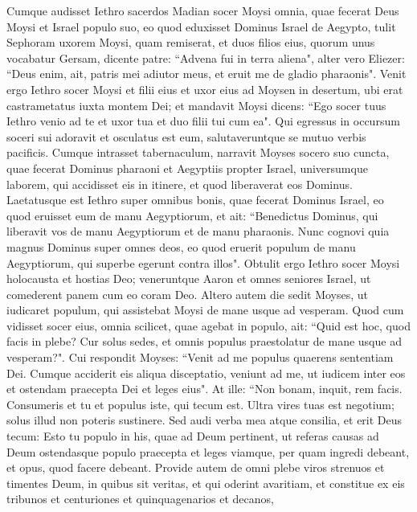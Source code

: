 \begin{biblechapter}  
\verse Cumque audisset Iethro sacerdos Madian socer Moysi omnia, quae fecerat Deus Moysi et Israel populo suo, eo quod eduxisset Dominus Israel de Aegypto,  
\verse tulit Sephoram uxorem Moysi, quam remiserat, 
\verse et duos filios eius, quorum unus vocabatur Gersam, dicente patre: “Advena fui in terra aliena", 
\verse alter vero Eliezer: “Deus enim, ait, patris mei adiutor meus, et eruit me de gladio pharaonis". 
\verse Venit ergo Iethro socer Moysi et filii eius et uxor eius ad Moysen in desertum, ubi erat castrametatus iuxta montem Dei; 
\verse et mandavit Moysi dicens: “Ego socer tuus Iethro venio ad te et uxor tua et duo filii tui cum ea". 
\verse Qui egressus in occursum soceri sui adoravit et osculatus est eum, salutaveruntque se mutuo verbis pacificis. Cumque intrasset tabernaculum, 
\verse narravit Moyses socero suo cuncta, quae fecerat Dominus pharaoni et Aegyptiis propter Israel, universumque laborem, qui accidisset eis in itinere, et quod liberaverat eos Dominus. 
\verse Laetatusque est Iethro super omnibus bonis, quae fecerat Dominus Israel, eo quod eruisset eum de manu Aegyptiorum, 
\verse et ait: “Benedictus Dominus, qui liberavit vos de manu Aegyptiorum et de manu pharaonis. 
\verse Nunc cognovi quia magnus Dominus super omnes deos, eo quod eruerit populum de manu Aegyptiorum, qui superbe egerunt contra illos". 
\verse Obtulit ergo Iethro socer Moysi holocausta et hostias Deo; veneruntque Aaron et omnes seniores Israel, ut comederent panem cum eo coram Deo. 
\verse Altero autem die sedit Moyses, ut iudicaret populum, qui assistebat Moysi de mane usque ad vesperam. 
\verse Quod cum vidisset socer eius, omnia scilicet, quae agebat in populo, ait: “Quid est hoc, quod facis in plebe? Cur solus sedes, et omnis populus praestolatur de mane usque ad vesperam?". 
\verse Cui respondit Moyses: “Venit ad me populus quaerens sententiam Dei. 
\verse Cumque acciderit eis aliqua disceptatio, veniunt ad me, ut iudicem inter eos et ostendam praecepta Dei et leges eius". 
\verse At ille: “Non bonam, inquit, rem facis. 
\verse Consumeris et tu et populus iste, qui tecum est. Ultra vires tuas est negotium; solus illud non poteris sustinere. 
\verse Sed audi verba mea atque consilia, et erit Deus tecum: Esto tu populo in his, quae ad Deum pertinent, ut referas causas ad Deum 
\verse ostendasque populo praecepta et leges viamque, per quam ingredi debeant, et opus, quod facere debeant. 
\verse Provide autem de omni plebe viros strenuos et timentes Deum, in quibus sit veritas, et qui oderint avaritiam, et constitue ex eis tribunos et centuriones et quinquagenarios et decanos, 

\end{biblechapter}
